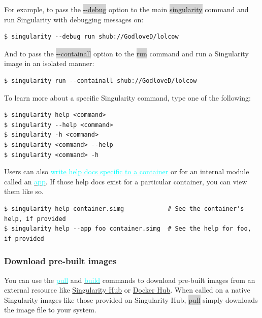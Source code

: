 \documentclass[a4paper]{article}
\begin{document}
For example, to pass the \colorbox{lightgray}{-{}-debug} option to the main \colorbox{lightgray}{singularity} command and run Singularity with debugging messages on:\\

\begin{lstlisting}[frame=single]  
$ singularity --debug run shub://GodloveD/lolcow
\end{lstlisting}

And to pass the \colorbox{lightgray}{-{}-containall} option to the \colorbox{lightgray}{run} command and run a Singularity image in an isolated manner:


\begin{lstlisting}[frame=single]  
$ singularity run --containall shub://GodloveD/lolcow
\end{lstlisting}

To learn more about a specific Singularity command, type one of the following:

\begin{lstlisting}[frame=single]  
$ singularity help <command>
$ singularity --help <command>
$ singularity -h <command>
$ singularity <command> --help
$ singularity <command> -h
\end{lstlisting}

Users can also \hyperref[sec:writehelpdocs]{{\textcolor{cyan}{write help docs specific to a container}}}  or for an internal module called an  \hyperref[sec:scifapps]{{\textcolor{cyan}{app}}}. If those help docs exist for a particular container, you can view them like so.\\[0.1in]

\begin{lstlisting}[frame=single]  
$ singularity help container.simg            # See the container's help, if provided
$ singularity help --app foo container.simg  # See the help for foo, if provided
\end{lstlisting}

\subsubsection{Download pre-built images}

You can use the \hyperref[sec:pull]{{\textcolor{cyan}{pull}}} and \hyperref[sec:build]{{\textcolor{cyan}{build}}} commands to download pre-built images from an external resource like \href{https://singularity-hub.org/}{Singularity Hub} or \href{https://hub.docker.com/}{Docker Hub}. When called on a native Singularity images like those provided on Singularity Hub, \colorbox{lightgray}{pull} simply downloads the image file to your system.
\end{document}
